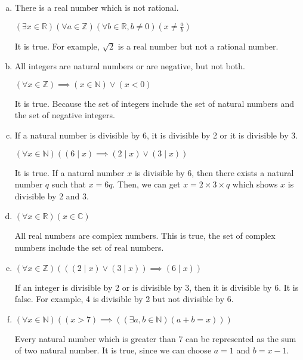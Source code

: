 \documentclass{article}
\begin{document}
\begin{enumerate}[(a)]
    \item There is a real number which is not rational.
    
    $(\exists x \in \mathbb{R}) (\forall a \in \mathbb{Z}) (\forall b \in \mathbb{R}, b \neq 0) (x \neq \frac{a}{b})$
    
    It is true. For example, $\sqrt{2}$ is a real number but not a rational number.
    
    \item All integers are natural numbers or are negative, but not both.
    
    $(\forall x \in \mathbb{Z}) \implies (x \in \mathbb{N}) \lor (x < 0)$
    
    It is true. Because the set of integers include the set of natural numbers and the set of negative integers.
    
    \item If a natural number is divisible by 6, it is divisible by 2 or it is divisible by 3.
    
    $(\forall x \in \mathbb{N}) \left( (6 \mid x) \implies (2 \mid x) \lor (3 \mid x) \right)$
    
    It is true. If a natural number $x$ is divisible by 6, then there exists a natural number $q$ such that $x = 6q$. Then, we can get $x = 2 \times 3 \times q$ which shows $x$ is divisible by 2 and 3.
    
    \item $(\forall x \in \mathbb{R}) (x \in \mathbb{C})$
    
    All real numbers are complex numbers. This is true, the set of complex numbers include the set of real numbers.
    
    \item $(\forall x \in \mathbb{Z}) \left( \left( (2 \mid x) \lor (3 \mid x) \right) \implies (6 \mid x) \right)$
    
    If an integer is divisible by 2 or is divisible by 3, then it is divisible by 6. It is false. For example, 4 is divisible by 2 but not divisible by 6.
    
    \item $(\forall x \in \mathbb{N}) \left( (x > 7) \implies \left( (\exists a, b \in \mathbb{N}) (a + b = x) \right) \right)$
    
    Every natural number which is greater than 7 can be represented as the sum of two natural number. It is true, since we can choose $a = 1$ and $b = x - 1$.
\end{enumerate}
\end{document}
